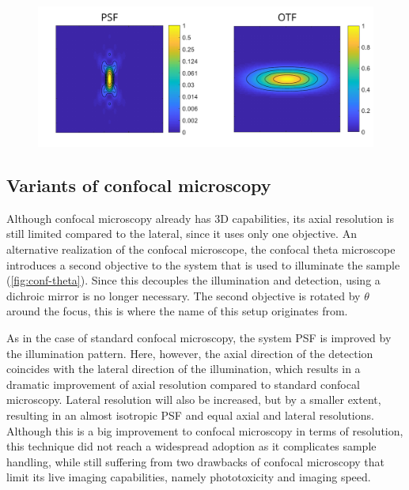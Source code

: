     \begin{figure}
      \centering
      \includegraphics[width=1\textwidth]{psfs/confocal.pdf}
      \label{fig:psf-confocal}
    \end{figure}


  \subsection{Variants of confocal microscopy}

    Although confocal microscopy already has 3D capabilities, its axial resolution is still limited compared to the lateral, since it uses only one objective. An alternative realization of the confocal microscope, the confocal theta microscope \cite{stelzer_fundamental_1994} introduces a second objective to the system that is used to illuminate the sample (\autoref{fig:conf-theta}). Since this decouples the illumination and detection, using a dichroic mirror is no longer necessary. The second objective is rotated by $\theta$ around the focus, this is where the name of this setup originates from.

    As in the case of standard confocal microscopy, the system PSF is improved by the illumination pattern. Here, however, the axial direction of the detection coincides with the lateral direction of the illumination, which results in a dramatic improvement of axial resolution compared to standard confocal microscopy. Lateral resolution will also be increased, but by a smaller extent, resulting in an almost isotropic PSF and equal axial and lateral resolutions. %
    Although this is a big improvement to confocal microscopy in terms of resolution, this technique did not reach a widespread adoption as it complicates sample handling, while still suffering from two drawbacks of confocal microscopy that limit its live imaging capabilities, namely phototoxicity and imaging speed.

